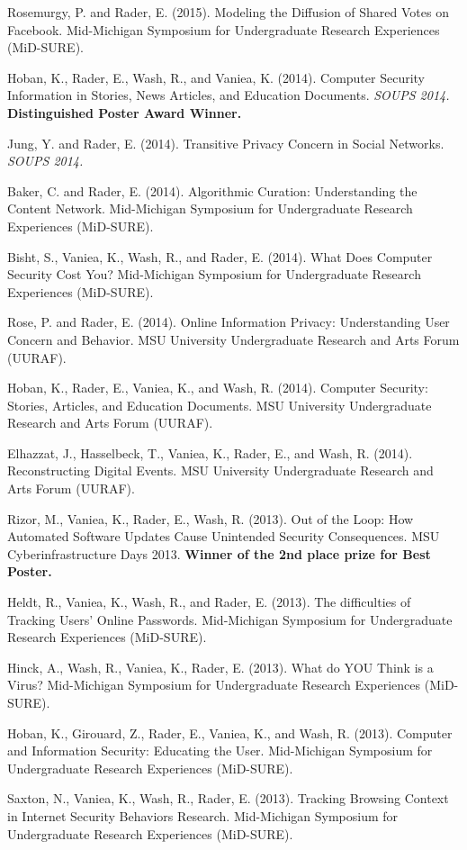 \documentclass[9pt]{extarticle}
\begin{document}
Rosemurgy, P. and Rader, E. (2015). Modeling the Diffusion of Shared Votes on Facebook. Mid-Michigan Symposium for Undergraduate Research Experiences (MiD-SURE).

Hoban, K., Rader, E., Wash, R., and Vaniea, K. (2014). Computer Security Information in Stories, News Articles, and Education Documents. \emph{SOUPS 2014.} \textbf{Distinguished Poster Award Winner.}

Jung, Y. and Rader, E. (2014). Transitive Privacy Concern in Social Networks. \emph{SOUPS 2014.}

Baker, C. and Rader, E. (2014). Algorithmic Curation: Understanding the Content Network. Mid-Michigan Symposium for Undergraduate Research Experiences (MiD-SURE).

Bisht, S., Vaniea, K., Wash, R., and Rader, E. (2014). What Does Computer Security Cost You? Mid-Michigan Symposium for Undergraduate Research Experiences (MiD-SURE).

Rose, P. and Rader, E. (2014). Online Information Privacy: Understanding User Concern and Behavior. MSU University Undergraduate Research and Arts Forum (UURAF).

Hoban, K., Rader, E., Vaniea, K., and Wash, R. (2014). Computer Security: Stories, Articles, and Education Documents. MSU University Undergraduate Research and Arts Forum (UURAF).

Elhazzat, J., Hasselbeck, T., Vaniea, K., Rader, E., and Wash, R. (2014). Reconstructing Digital Events. MSU University Undergraduate Research and Arts Forum (UURAF).

Rizor, M., Vaniea, K., Rader, E., Wash, R. (2013). Out of the Loop: How Automated Software Updates Cause Unintended Security Consequences. MSU Cyberinfrastructure Days 2013. \textbf{Winner of the 2nd place prize for Best Poster.}

Heldt, R., Vaniea, K., Wash, R., and Rader, E. (2013). The difficulties of Tracking Users' Online Passwords. Mid-Michigan Symposium for Undergraduate Research Experiences (MiD-SURE). 

Hinck, A., Wash, R., Vaniea, K., Rader, E. (2013). What do YOU Think is a Virus? Mid-Michigan Symposium for Undergraduate Research Experiences (MiD-SURE).

Hoban, K., Girouard, Z., Rader, E., Vaniea, K., and Wash, R. (2013). Computer and Information Security: Educating the User. Mid-Michigan Symposium for Undergraduate Research Experiences (MiD-SURE).

Saxton, N., Vaniea, K., Wash, R., Rader, E. (2013). Tracking Browsing Context in Internet Security Behaviors Research. Mid-Michigan Symposium for Undergraduate Research Experiences (MiD-SURE).
\end{document}
